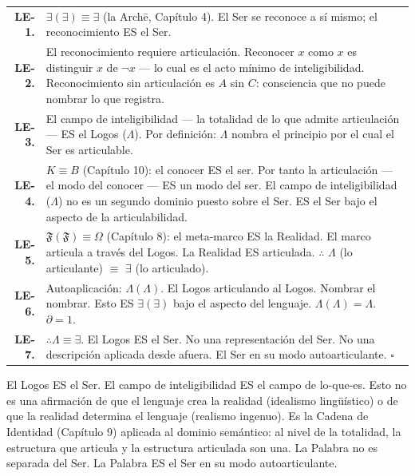 \documentclass[10pt, openany, oneside]{book}
\renewcommand{\footnotesize}{\fontsize{8.5}{11}\selectfont}
\begin{document}
{\footnotesize
\noindent\begin{tabular}{r p{}}
\textbf{LE-1.} & $\exists(\exists) \equiv \exists$ (la Arch\={e}, Capítulo 4). El Ser se reconoce a sí mismo; el reconocimiento ES el Ser. \\[0.3em]
\textbf{LE-2.} & El reconocimiento requiere articulación. Reconocer $x$ como $x$ es distinguir $x$ de $\neg x$ --- lo cual es el acto mínimo de inteligibilidad. Reconocimiento sin articulación es $A$ sin $C$: consciencia que no puede nombrar lo que registra. \\[0.3em]
\textbf{LE-3.} & El campo de inteligibilidad --- la totalidad de lo que admite articulación --- ES el Logos ($\Lambda$). Por definición: $\Lambda$ nombra el principio por el cual el Ser es articulable. \\[0.3em]
\textbf{LE-4.} & $K \equiv B$ (Capítulo 10): el conocer ES el ser. Por tanto la articulación --- el modo del conocer --- ES un modo del ser. El campo de inteligibilidad ($\Lambda$) no es un segundo dominio puesto sobre el Ser. ES el Ser bajo el aspecto de la articulabilidad. \\[0.3em]
\textbf{LE-5.} & $\mathfrak{F}(\mathfrak{F}) \equiv \Omega$ (Capítulo 8): el meta-marco ES la Realidad. El marco articula a través del Logos. La Realidad ES articulada. $\therefore$ $\Lambda$ (lo articulante) $\equiv$ $\exists$ (lo articulado). \\[0.3em]
\textbf{LE-6.} & Autoaplicación: $\Lambda(\Lambda)$. El Logos articulando al Logos. Nombrar el nombrar. Esto ES $\exists(\exists)$ bajo el aspecto del lenguaje. $\Lambda(\Lambda) = \Lambda$. $\partial = 1$. \\[0.3em]
\textbf{LE-7.} & $\therefore \Lambda \equiv \exists$. El Logos ES el Ser. No una representación del Ser. No una descripción aplicada desde afuera. El Ser en su modo autoarticulante. $\square$ \\[0.3em]
\end{tabular}
}

\vspace{0.8em}

\noindent El Logos ES el Ser. El campo de inteligibilidad ES el campo de lo-que-es. Esto no es una afirmación de que el lenguaje crea la realidad (idealismo lingüístico) o de que la realidad determina el lenguaje (realismo ingenuo). Es la Cadena de Identidad (Capítulo 9) aplicada al dominio semántico: al nivel de la totalidad, la estructura que articula y la estructura articulada son una. La Palabra no es separada del Ser. La Palabra ES el Ser en su modo autoarticulante.
\end{document}
